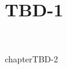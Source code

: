 \documentclass[oneside]{book}
\theoremstyle{definition}
\begin{document}
	\tableofcontents
	
    \chapter{TBD-1}
    \newpage
   	

    \
    
    
    
    
    
    
    
    
    
    
    
    
    
    
    
    
    chapter{TBD-2}
    \newpage
   	

\newpage




\nocite{*}

\end{document}
